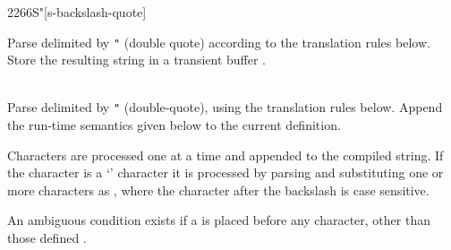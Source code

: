 \vspace{2ex}
\begin{worddef}[Seq]{2266}{S\bs"}[s-backslash-quote]%
\interpret

	Parse  delimited by \texttt{"} (double quote) according to the
	translation rules below.  Store the resulting string in a transient buffer
	.

\compile {} \\
	Parse  delimited by \verb|"| (double-quote), using the
	translation rules below. Append the run-time semantics given below to
	the current definition.

\item[Translation rules]
	Characters are processed one at a time and appended to the compiled
	string. If the character is a `\bs' character it is processed by
	parsing and substituting one or more characters as
	, where
	the character after the backslash is case sensitive.

	An ambiguous condition exists if a \bs{} is placed before any character,
	other than those defined .


\end{worddef}
